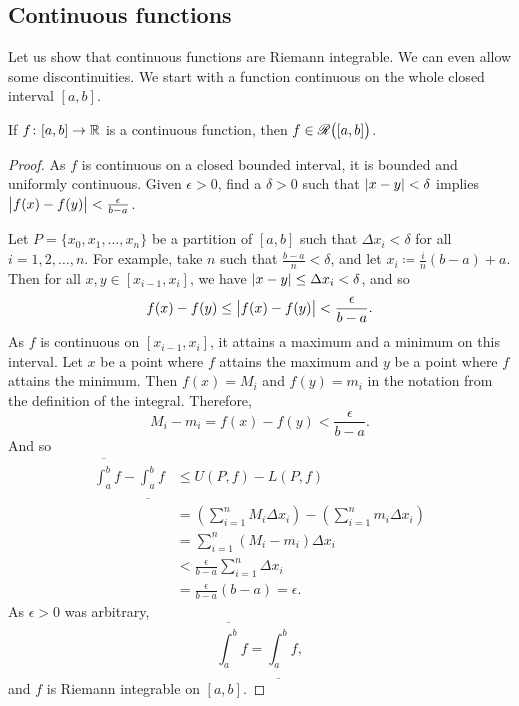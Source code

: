 \subsection{Continuous functions}

Let us show that continuous functions are Riemann integrable.
We can even allow some discontinuities.  We start with a
function continuous on the whole closed interval $[a,b]$.

\begin{lemma} \label{lemma:contint}
If $f \colon [a,b] \to {\mathbb{R}}$ is a continuous function,
then $f \in {\mathscr{R}}\bigl([a,b]\bigr)$.
\end{lemma}

\begin{proof}
As $f$ is continuous on a closed bounded interval, it is
bounded and
uniformly continuous.
Given $\epsilon > 0$, find a $\delta > 0$ such that
$\lvert {x-y} \rvert < \delta$ implies $\bigl\lvert {f(x)-f(y)} \bigr\rvert < \frac{\epsilon}{b-a}$.

Let $P = \{ x_0, x_1, \ldots, x_n \}$
be a partition of $[a,b]$ such that $\Delta x_i < \delta$ for all $i = 1,2,
\ldots, n$.  For example,
take $n$ such that $\frac{b-a}{n} < \delta$, and
let $x_i \coloneqq \frac{i}{n}(b-a) + a$.
Then for all $x, y \in [x_{i-1},x_i]$, we have 
$\lvert {x-y} \rvert \leq \Delta x_i < \delta$, and so
\begin{equation*}
f(x)-f(y) \leq \bigl\lvert {f(x)-f(y)} \bigr\rvert < \frac{\epsilon}{b-a} .
\end{equation*}
As $f$ is continuous on $[x_{i-1},x_i]$, it attains a maximum and a minimum
on this interval.
Let $x$ be a point where $f$ attains the maximum and $y$ be a point
where $f$ attains the minimum.  Then $f(x) = M_i$
and $f(y) = m_i$ in the notation from the definition of the integral.
Therefore,
\begin{equation*}
M_i-m_i = f(x)-f(y) < 
\frac{\epsilon}{b-a} .
\end{equation*}
And so
\begin{equation*}
\begin{split}
\overline{\int_a^b} f - 
\underline{\int_a^b} f 
& \leq
U(P,f) - L(P,f)
\\
& =
\left(
\sum_{i=1}^n
M_i \Delta x_i
\right)
-
\left(
\sum_{i=1}^n
m_i \Delta x_i
\right)
\\
& =
\sum_{i=1}^n
(M_i-m_i) \Delta x_i
\\
& <
\frac{\epsilon}{b-a}
\sum_{i=1}^n
\Delta x_i
\\
& =
\frac{\epsilon}{b-a} (b-a)
= \epsilon .
\end{split}
\end{equation*}
As $\epsilon > 0$ was arbitrary,
\begin{equation*}
\overline{\int_a^b} f = \underline{\int_a^b} f ,
\end{equation*}
and $f$ is Riemann integrable on $[a,b]$.
\end{proof}

